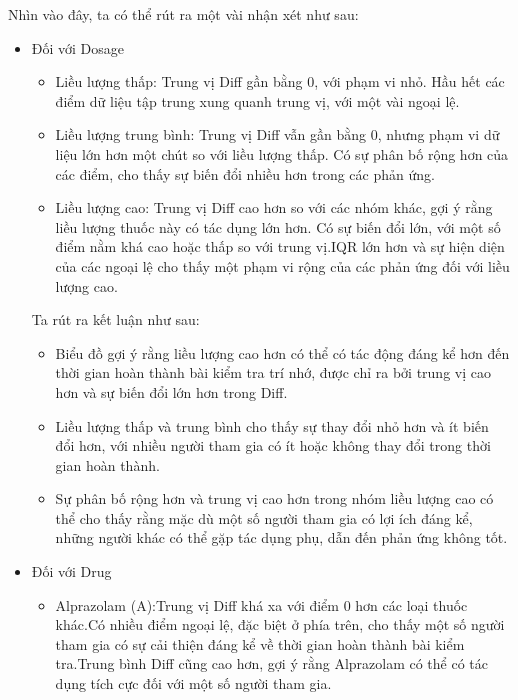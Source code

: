 \begin{itemize}
    Nhìn vào đây, ta có thể rút ra một vài nhận xét như sau:
    \begin{itemize}
        \item Đối với Dosage
        \begin{itemize}
            \item Liều lượng thấp: Trung vị Diff gần bằng 0, với phạm vi nhỏ. Hầu hết các điểm dữ liệu tập trung xung quanh trung vị, với một vài ngoại lệ.
            \item Liều lượng trung bình: Trung vị Diff vẫn gần bằng 0, nhưng phạm vi dữ liệu lớn hơn một chút so với liều lượng thấp. Có sự phân bố rộng hơn của các điểm, cho thấy sự biến đổi nhiều hơn trong các phản ứng.
            \item  Liều lượng cao: Trung vị Diff cao hơn so với các nhóm khác, gợi ý rằng liều lượng thuốc này có tác dụng lớn hơn. Có sự biến đổi lớn, với một số điểm nằm khá cao hoặc thấp so với trung vị.IQR lớn hơn và sự hiện diện của các ngoại lệ cho thấy một phạm vi rộng của các phản ứng đối với liều lượng cao.
        \end{itemize}
        Ta rút ra kết luận như sau:
            \begin{itemize}
                \item Biểu đồ gợi ý rằng liều lượng cao hơn có thể có tác động đáng kể hơn đến thời gian hoàn thành bài kiểm tra trí nhớ, được chỉ ra bởi trung vị cao hơn và sự biến đổi lớn hơn trong Diff.
                \item Liều lượng thấp và trung bình cho thấy sự thay đổi nhỏ hơn và ít biến đổi hơn, với nhiều người tham gia có ít hoặc không thay đổi trong thời gian hoàn thành.
                \item Sự phân bố rộng hơn và trung vị cao hơn trong nhóm liều lượng cao có thể cho thấy rằng mặc dù một số người tham gia có lợi ích đáng kể, những người khác có thể gặp tác dụng phụ, dẫn đến phản ứng không tốt.

            \end{itemize}
        \item  Đối với Drug
        \begin{itemize}
            \item Alprazolam (A):Trung vị Diff khá xa với điểm 0 hơn các loại thuốc khác.Có nhiều điểm ngoại lệ, đặc biệt ở phía trên, cho thấy một số người tham gia có sự cải thiện đáng kể về thời gian hoàn thành bài kiểm tra.Trung bình Diff cũng cao hơn, gợi ý rằng Alprazolam có thể có tác dụng tích cực đối với một số người tham gia.


\end{itemize}
\end{itemize}
\end{itemize}
